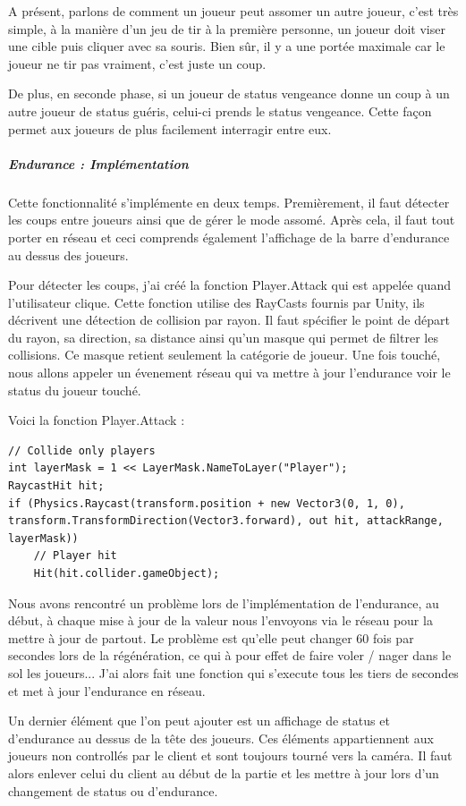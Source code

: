 \documentclass{article}
\begin{document}
A présent, parlons de comment un joueur peut assomer un autre joueur, c'est très simple, à la manière d'un jeu de tir à la première personne, un joueur doit viser une cible puis cliquer avec sa souris. Bien sûr, il y a une portée maximale car le joueur ne tir pas vraiment, c'est juste un coup.

De plus, en seconde phase, si un joueur de status vengeance donne un coup à un autre joueur de status guéris, celui-ci prends le status vengeance. Cette façon permet aux joueurs de plus facilement interragir entre eux.

\subparagraph{Endurance : Implémentation}

Cette fonctionnalité s'implémente en deux temps. Premièrement, il faut détecter les coups entre joueurs ainsi que de gérer le mode assomé. Après cela, il faut tout porter en réseau et ceci comprends également l'affichage de la barre d'endurance au dessus des joueurs.

Pour détecter les coups, j'ai créé la fonction Player.Attack qui est appelée quand l'utilisateur clique. Cette fonction utilise des RayCasts fournis par Unity, ils décrivent une détection de collision par rayon. Il faut spécifier le point de départ du rayon, sa direction, sa distance ainsi qu'un masque qui permet de filtrer les collisions. Ce masque retient seulement la catégorie de joueur.
Une fois touché, nous allons appeler un évenement réseau qui va mettre à jour l'endurance voir le status du joueur touché.

Voici la fonction Player.Attack :

\begin{lstlisting}
// Collide only players
int layerMask = 1 << LayerMask.NameToLayer("Player");
RaycastHit hit;
if (Physics.Raycast(transform.position + new Vector3(0, 1, 0), transform.TransformDirection(Vector3.forward), out hit, attackRange, layerMask))
	// Player hit
	Hit(hit.collider.gameObject);
\end{lstlisting}

Nous avons rencontré un problème lors de l'implémentation de l'endurance, au début, à chaque mise à jour de la valeur nous l'envoyons via le réseau pour la mettre à jour de partout. Le problème est qu'elle peut changer 60 fois par secondes lors de la régénération, ce qui à pour effet de faire voler / nager dans le sol les joueurs... J'ai alors fait une fonction qui s'execute tous les tiers de secondes et met à jour l'endurance en réseau.

Un dernier élément que l'on peut ajouter est un affichage de status et d'endurance au dessus de la tête des joueurs. Ces éléments appartiennent aux joueurs non controllés par le client et sont toujours tourné vers la caméra. Il faut alors enlever celui du client au début de la partie et les mettre à jour lors d'un changement de status ou d'endurance.
\end{document}
